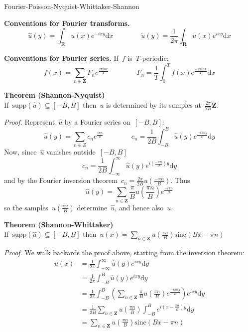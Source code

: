 
\newcommand{\ud}{\mathrm{d}}
\newcommand{\R}{\mathbf{R}}
\newcommand{\Z}{\mathbf{Z}}

{\large Fourier-Poisson-Nyquist-Whittaker-Shannon}

\bigskip

{\bf Conventions for Fourier transforms.}
\[
	\widehat{u}(y)=\int_\R u(x)e^{-ixy}\ud x
	\qquad\qquad
	\check{u}(y)=\frac{1}{2\pi}\int_\R u(x)e^{ixy}\ud x
\]

{\bf Conventions for Fourier series.}
If~$f$ is~$T$-periodic:
\[
	f(x)=\sum_{n\in\Z}F_n e^{\frac{2\pi i nx}{T}}
	\qquad\qquad
	F_n=\frac1T\int_0^T f(x)e^{\frac{-2\pi i nx}{T}}\ud x
\]

{\bf Theorem (Shannon-Nyquist)}\\
If~$\mathrm{supp}(\widehat{u})\subseteq[-B,B]$ then~$u$ is determined by its
samples at~$\frac{2\pi}{2B}\Z$.

{\it Proof.}
Represent~$\widehat{u}$ by a Fourier series on~$[-B,B]$:
\[
	\widehat{u}(y)=\sum_{n\in Z} c_n e^{\frac{i\pi n}{B}}
	\qquad\qquad
	c_n=\frac1{2B}\int_{-B}^B \widehat{u}(y)e^{\frac{-i\pi ny}{B}}\ud y
\]
Now, since~$\widehat{u}$ vanishes outside~$[-B,B]$
\[
	c_n = \frac1{2B}\int_{-\infty}^\infty
	\widehat{u}(y)e^{i\left(\frac{-\pi n}B\right)y}
	\ud y
\]
and by the Fourier inversion theorem~$c_n=\frac{2\pi}{2B}u\left(\frac{-\pi n}B\right)$.
Thus
\[
	\widehat{u}(y)=\sum_{n\in\Z}\frac\pi Bu\left(\frac{\pi n}B\right)
		e^{\frac{-i\pi n}B}
\]
so the samples~$u\left(\frac{\pi n}B\right)$ determine~$\widehat{u}$,
and hence also~$u$.
\hfill\qedsymbol


{\bf Theorem (Shannon-Whittaker)}\\
If~$\mathrm{supp}(\widehat{u})\subseteq[-B,B]$
then~$\displaystyle u(x)=\sum_{n\in\Z}u\left(\frac{\pi
n}B\right)\mathrm{sinc}\left(Bx-\pi n\right)$

{\it Proof.}
We walk backards the proof above, starting from the inversion
theorem:
\begin{align*}
	u(x) &= \frac1{2\pi}\int_{-\infty}^{\infty}\widehat{u}(y)e^{ixy}\ud y \\
	&= \frac1{2\pi}\int_{-B}^B\widehat{u}(y)e^{ixy}\ud y \\
	&= \frac1{2\pi}\int_{-B}^B\left(\sum_{n\in \Z}\frac\pi Bu\left(\frac{\pi n}B\right)e^{\frac{-i\pi n y}B}\right)e^{ixy}\ud y \\
	&= \frac1{2B}\sum_{n\in\Z}u\left(\frac{\pi n}B\right)\int_{-B}^Be^{i\left(x-\frac{\pi n}B\right)y}\ud y\\
	&= \sum_{n\in\Z}u\left(\frac{\pi n}B\right)\mathrm{sinc}\left(Bx-\pi
	n\right)
\end{align*}
\hfill\qedsymbol


